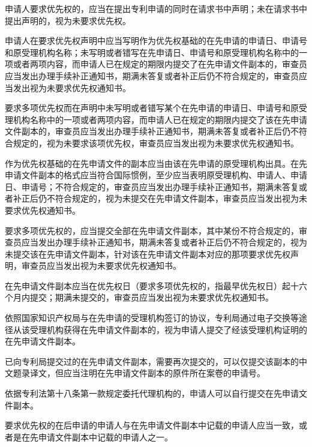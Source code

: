 申请人要求优先权的，应当在提出专利申请的同时在请求书中声明；未在请求书中提出声明的，视为未要求优先权。

申请人在要求优先权声明中应当写明作为优先权基础的在先申请的申请日、申请号和原受理机构名称；未写明或者错写在先申请日、申请号和原受理机构名称中的一项或者两项内容，而申请人已在规定的期限内提交了在先申请文件副本的，审查员应当发出办理手续补正通知书，期满未答复或者补正后仍不符合规定的，审查员应当发出视为未要求优先权通知书。

要求多项优先权而在声明中未写明或者错写某个在先申请的申请日、申请号和原受理机构名称中的一项或者两项内容，而申请人已在规定的期限内提交了该在先申请文件副本的，审查员应当发出办理手续补正通知书，期满未答复或者补正后仍不符合规定的，视为未要求该项优先权，审查员应当发出视为未要求优先权通知书。


作为优先权基础的在先申请文件的副本应当由该在先申请的原受理机构出具。在先申请文件副本的格式应当符合国际惯例，至少应当表明原受理机构、申请人、申请日、申请号；不符合规定的，审查员应当发出办理手续补正通知书，期满未答复或者补正后仍不符合规定的，视为未提交在先申请文件副本，审查员应当发出视为未要求优先权通知书。

要求多项优先权的，应当提交全部在先申请文件副本，其中某份不符合规定的，审查员应当发出办理手续补正通知书，期满未答复或者补正后仍不符合规定的，视为未提交该在先申请文件副本，针对该在先申请文件副本对应的那项要求优先权声明，审查员应当发出视为未要求优先权通知书。

在先申请文件副本应当在优先权日（要求多项优先权的，指最早优先权日）起十六个月内提交；期满未提交的，审查员应当发出视为未要求优先权通知书。

依照国家知识产权局与在先申请的受理机构签订的协议，专利局通过电子交换等途径从该受理机构获得在先申请文件副本的，视为申请人提交了经该受理机构证明的在先申请文件副本。

已向专利局提交过的在先申请文件副本，需要再次提交的，可以仅提交该副本的中文题录译文，但应当注明在先申请文件副本的原件所在案卷的申请号。

依据专利法第十八条第一款规定委托代理机构的，申请人可以自行提交在先申请文件副本。

要求优先权的在后申请的申请人与在先申请文件副本中记载的申请人应当一致，或者是在先申请文件副本中记载的申请人之一。

